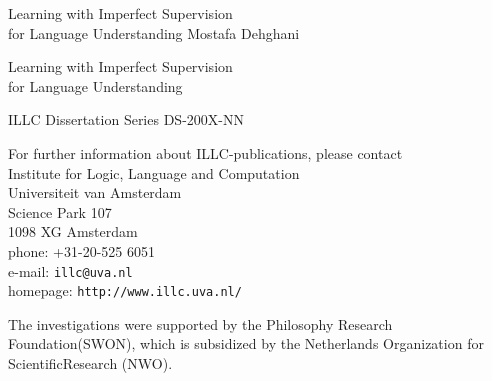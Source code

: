 {\pagestyle{empty}
\newcommand{\printtitle}{%
{\Huge 
Learning with Imperfect Supervision \\[0.8cm] for Language Understanding
}}    %

\begin{titlepage}
\par\vskip 2cm
\begin{center}
\printtitle
\vfill
{\LARGE Mostafa Dehghani}                           %
\vskip 2cm
\end{center}
\end{titlepage}
%
%
\mbox{}\newpage
\setcounter{page}{1}

\par\vskip 2cm
\begin{center}
\printtitle
\end{center}

\clearpage
\par\vskip 2cm
\begin{center}
ILLC Dissertation Series DS-200X-NN                 %
\par\vspace {2cm}
\illclogo{10cm}
\par\vspace {2cm}
\noindent%
For further information about ILLC-publications, please contact\\[2ex]
Institute for Logic, Language and Computation\\
Universiteit van Amsterdam\\
Science Park 107\\
1098 XG Amsterdam\\
phone: +31-20-525 6051\\
e-mail: {\tt illc@uva.nl}\\
homepage: {\tt http://www.illc.uva.nl/}
\end{center}
\vfill

%
\noindent%
The investigations were supported by the            %
Philosophy Research Foundation\linebreak (SWON), 
which is subsidized by the Netherlands 
Organization for Scientific\linebreak Research (NWO).
\par\vspace {2cm}

}
